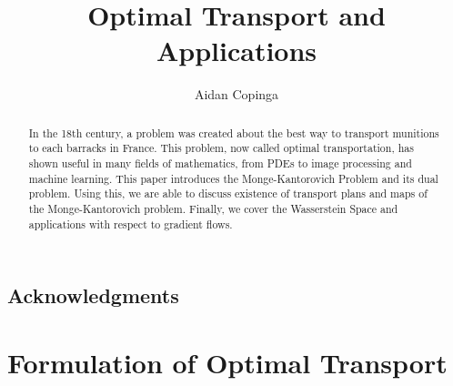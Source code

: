 \documentclass[12pt]{article}
\theoremstyle{plain}
\numberwithin{equation}{section}
\begin{document}
\title{Optimal Transport and Applications}
\author{Aidan Copinga}
\begin{abstract}

In the 18th century, a problem was created about the best way to transport munitions to each barracks in France. This problem, now called optimal transportation, has shown useful in many fields of mathematics, from PDEs to image processing and machine learning.
This paper introduces the Monge-Kantorovich Problem and its dual problem. Using this, we are able to discuss existence of transport plans and maps of the Monge-Kantorovich problem. Finally, we cover the Wasserstein Space and applications with respect to gradient flows.

\end{abstract}
\maketitle
\tableofcontents

\subsection*{Acknowledgments}
\section{Formulation of Optimal Transport}
\end{document}
